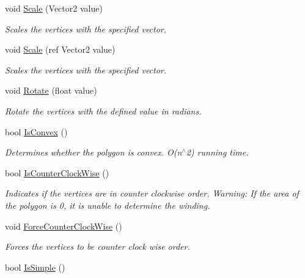 \begin{DoxyCompactItemize}
void \hyperlink{class_farseer_physics_1_1_common_1_1_vertices_a6fa9be7cbdf673988ac21be69cda3614}{Scale} (Vector2 value)
\begin{DoxyCompactList}\small\item\em Scales the vertices with the specified vector. \end{DoxyCompactList}\item 
void \hyperlink{class_farseer_physics_1_1_common_1_1_vertices_afe7f3ef91d8fe7eb188a290e127d5b41}{Scale} (ref Vector2 value)
\begin{DoxyCompactList}\small\item\em Scales the vertices with the specified vector. \end{DoxyCompactList}\item 
void \hyperlink{class_farseer_physics_1_1_common_1_1_vertices_af8c3a4b73c05b6556752d2bff70e3819}{Rotate} (float value)
\begin{DoxyCompactList}\small\item\em Rotate the vertices with the defined value in radians. \end{DoxyCompactList}\item 
bool \hyperlink{class_farseer_physics_1_1_common_1_1_vertices_af83faabcc82176674229befaa7da7d8c}{Is\+Convex} ()
\begin{DoxyCompactList}\small\item\em Determines whether the polygon is convex. O(n$^\wedge$2) running time. \end{DoxyCompactList}\item 
bool \hyperlink{class_farseer_physics_1_1_common_1_1_vertices_a43d61a329ebe7ebe784ee1aa9ae6a2a3}{Is\+Counter\+Clock\+Wise} ()
\begin{DoxyCompactList}\small\item\em Indicates if the vertices are in counter clockwise order. Warning\+: If the area of the polygon is 0, it is unable to determine the winding. \end{DoxyCompactList}\item 
void \hyperlink{class_farseer_physics_1_1_common_1_1_vertices_afccad120443de577a21bbdfd70a4ef9c}{Force\+Counter\+Clock\+Wise} ()
\begin{DoxyCompactList}\small\item\em Forces the vertices to be counter clock wise order. \end{DoxyCompactList}\item 
bool \hyperlink{class_farseer_physics_1_1_common_1_1_vertices_a0db95e4f9616196b5f894a8c9c0fdc00}{Is\+Simple} ()

\end{DoxyCompactItemize}
